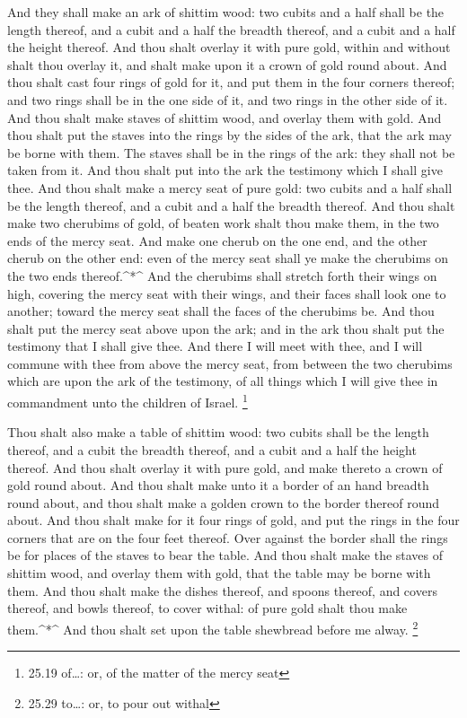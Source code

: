  And they shall make an ark of shittim wood: two cubits and
a half shall be the length thereof, and a cubit and a half the breadth
thereof, and a cubit and a half the height thereof.  And
thou shalt overlay it with pure gold, within and without shalt thou
overlay it, and shalt make upon it a crown of gold round about.
 And thou shalt cast four rings of gold for it, and put
them in the four corners thereof; and two rings shall be in the one side
of it, and two rings in the other side of it.  And thou
shalt make staves of shittim wood, and overlay them with gold.
 And thou shalt put the staves into the rings by the sides
of the ark, that the ark may be borne with them.  The
staves shall be in the rings of the ark: they shall not be taken from
it.  And thou shalt put into the ark the testimony which I
shall give thee.  And thou shalt make a mercy seat of pure
gold: two cubits and a half shall be the length thereof, and a cubit and
a half the breadth thereof.  And thou shalt make two
cherubims of gold, of beaten work shalt thou make them, in the two ends
of the mercy seat.  And make one cherub on the one end, and
the other cherub on the other end: even of the mercy seat shall ye make
the cherubims on the two ends thereof.\^{}*\^{}  And the
cherubims shall stretch forth their wings on high, covering the mercy
seat with their wings, and their faces shall look one to another; toward
the mercy seat shall the faces of the cherubims be.  And
thou shalt put the mercy seat above upon the ark; and in the ark thou
shalt put the testimony that I shall give thee.  And there
I will meet with thee, and I will commune with thee from above the mercy
seat, from between the two cherubims which are upon the ark of the
testimony, of all things which I will give thee in commandment unto the
children of Israel. \footnote{25.19 of\ldots: or, of the matter of the
  mercy seat}

 Thou shalt also make a table of shittim wood: two cubits
shall be the length thereof, and a cubit the breadth thereof, and a
cubit and a half the height thereof.  And thou shalt
overlay it with pure gold, and make thereto a crown of gold round about.
 And thou shalt make unto it a border of an hand breadth
round about, and thou shalt make a golden crown to the border thereof
round about.  And thou shalt make for it four rings of
gold, and put the rings in the four corners that are on the four feet
thereof.  Over against the border shall the rings be for
places of the staves to bear the table.  And thou shalt
make the staves of shittim wood, and overlay them with gold, that the
table may be borne with them.  And thou shalt make the
dishes thereof, and spoons thereof, and covers thereof, and bowls
thereof, to cover withal: of pure gold shalt thou make them.\^{}*\^{}
 And thou shalt set upon the table shewbread before me
alway. \footnote{25.29 to\ldots: or, to pour out withal}

